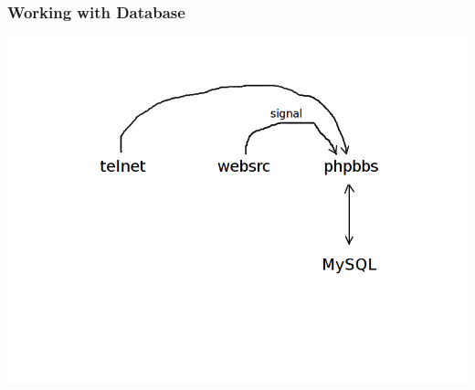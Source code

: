 \documentclass[slidestop,compress,mathserif]{beamer}
\begin{document}
  \begin{frame}
    \frametitle{Working with Database}
    \includegraphics[scale=0.35]{withdb.png}
  \end{frame}

  {\aauwavesbg
  \begin{frame}
  \end{frame}}
\end{document}

